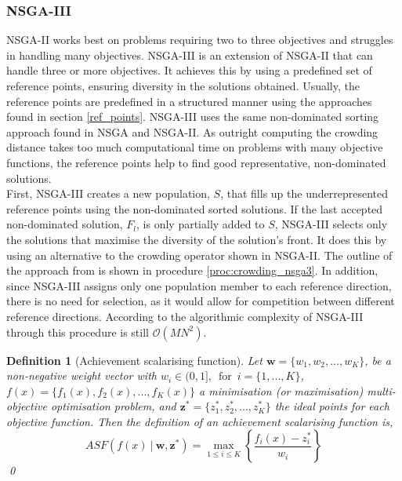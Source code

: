 \documentclass[mscthesis, 11pt]{usiinfthesis}
\theoremstyle{newdefinition}
\newtheorem{definition}{Definition}[section]
\begin{document}
\subsubsection{NSGA-III}\label{sec:nsga3}
NSGA-II works best on problems requiring two to three objectives and struggles in handling many objectives. NSGA-III is an extension of NSGA-II that can handle three or more objectives. It achieves this by using a predefined set of reference points, ensuring diversity in the solutions obtained. Usually, the reference points are predefined in a structured manner using the approaches found in section \ref{ref_points}. NSGA-III uses the same non-dominated sorting approach found in NSGA and NSGA-II. As outright computing the crowding distance takes too much computational time on problems with many objective functions, the reference points help to find good representative, non-dominated solutions. 
\\
First, NSGA-III creates a new population, $S$, that fills up the underrepresented reference points using the non-dominated sorted solutions.  If the last accepted non-dominated solution, $F_l$, is only partially added to $S$, NSGA-III selects only the solutions that maximise the diversity of the solution's front. It does this by using an alternative to the crowding operator shown in NSGA-II. The outline of the approach from \cite[~pp.~581--583]{deb_evolutionary_2014} is shown in procedure \ref{proc:crowding_nsga3}. In addition, since NSGA-III assigns only one population member to each reference direction, there is no need for selection, as it would allow for competition between different reference directions.
According to \cite[~p.~583]{deb_evolutionary_2014} the algorithmic complexity of NSGA-III through this procedure is still $\mathcal{O}(MN^2)$.
\begin{definition}[Achievement scalarising function]\label{def:asf}
    Let $\mathbf{w} = \{w_1, w_2, ..., w_K\}$, be a non-negative weight vector with $ w_i \in (0, 1], \enspace \text{for} \enspace i = \{1, ...,K\}$, $f(x) = \{f_1 (x), f_2 (x), ...,f_K (x)\}$ a minimisation (or maximisation) multi-objective optimisation problem, and $\mathbf{z}^* = \{z^{*}_1, z^{*}_2, ..., z^{*}_K\}$ the ideal points for each objective function. Then the definition of an achievement scalarising function is,
    \begin{equation}
        ASF(f(x)\: | \: \mathbf{w, z^*}) = \max_{1 \leq i \leq K} \left \{\frac{f_i(x) - z^{*}_i}{w_i}\right \} 
    \end{equation}
    \qed
\end{definition}
\clearpage
\end{document}
